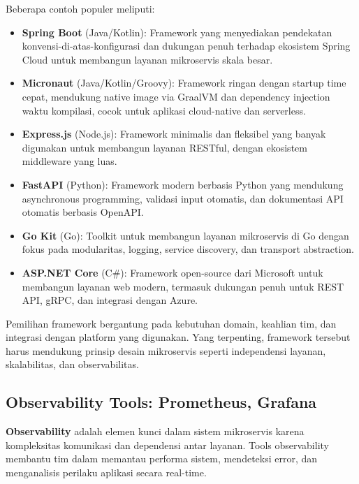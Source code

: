 Beberapa contoh populer meliputi:

\begin{itemize}
	\item \textbf{Spring Boot} (Java/Kotlin): Framework yang menyediakan pendekatan konvensi-di-atas-konfigurasi dan dukungan penuh terhadap ekosistem Spring Cloud untuk membangun layanan mikroservis skala besar.
	
	\item \textbf{Micronaut} (Java/Kotlin/Groovy): Framework ringan dengan startup time cepat, mendukung native image via GraalVM dan dependency injection waktu kompilasi, cocok untuk aplikasi cloud-native dan serverless.
	
	\item \textbf{Express.js} (Node.js): Framework minimalis dan fleksibel yang banyak digunakan untuk membangun layanan RESTful, dengan ekosistem middleware yang luas.
	
	\item \textbf{FastAPI} (Python): Framework modern berbasis Python yang mendukung asynchronous programming, validasi input otomatis, dan dokumentasi API otomatis berbasis OpenAPI.
	
	\item \textbf{Go Kit} (Go): Toolkit untuk membangun layanan mikroservis di Go dengan fokus pada modularitas, logging, service discovery, dan transport abstraction.
	
	\item \textbf{ASP.NET Core} (C\#): Framework open-source dari Microsoft untuk membangun layanan web modern, termasuk dukungan penuh untuk REST API, gRPC, dan integrasi dengan Azure.
\end{itemize}

Pemilihan framework bergantung pada kebutuhan domain, keahlian tim, dan integrasi dengan platform yang digunakan. Yang terpenting, framework tersebut harus mendukung prinsip desain mikroservis seperti independensi layanan, skalabilitas, dan observabilitas.


\subsection{Observability Tools: Prometheus, Grafana}

\textbf{Observability} adalah elemen kunci dalam sistem mikroservis karena kompleksitas komunikasi dan dependensi antar layanan. Tools observability membantu tim dalam memantau performa sistem, mendeteksi error, dan menganalisis perilaku aplikasi secara real-time.


